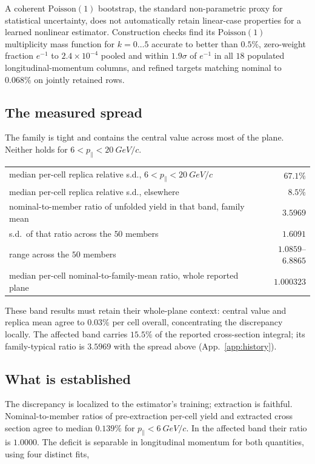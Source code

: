A coherent $\mathrm{Poisson}(1)$ bootstrap, the standard non-parametric proxy for statistical uncertainty, does not automatically retain linear-case properties for a learned nonlinear estimator. Construction checks find its $\mathrm{Poisson}(1)$ multiplicity mass function for $k=0\ldots5$ accurate to better than $0.5\%$, zero-weight fraction $e^{-1}$ to $2.4\times10^{-4}$ pooled and within $1.9\sigma$ of $e^{-1}$ in all $18$ populated longitudinal-momentum columns, and refined targets matching nominal to $0.068\%$ on jointly retained rows.

\subsection{The measured spread}

The family is tight and contains the central value across most of the plane. Neither holds for $6 < p_{\parallel} < \SI{20}{GeV/c}$.

\begin{center}
\begin{tabular}{lr}
\hline
median per-cell replica relative s.d., $6<p_{\parallel}<\SI{20}{GeV/c}$ & $67.1\%$ \\
median per-cell replica relative s.d., elsewhere & $8.5\%$ \\
nominal-to-member ratio of unfolded yield in that band, family mean & $3.5969$ \\
s.d.\ of that ratio across the $50$ members & $1.6091$ \\
range across the $50$ members & $1.0859$--$6.8865$ \\
median per-cell nominal-to-family-mean ratio, whole reported plane & $1.000323$ \\
\hline
\end{tabular}
\end{center}

These band results must retain their whole-plane context: central value and replica mean agree to $0.03\%$ per cell overall, concentrating the discrepancy locally. The affected band carries $15.5\%$ of the reported cross-section integral; its family-typical ratio is $3.5969$ with the spread above (App.~\ref{app:history}).

\subsection{What is established}

The discrepancy is localized to the estimator's training; extraction is faithful. Nominal-to-member ratios of pre-extraction per-cell yield and extracted cross section agree to median $0.139\%$ for $p_{\parallel} < \SI{6}{GeV/c}$. In the affected band their ratio is $1.0000$. The deficit is separable in longitudinal momentum for both quantities, using four distinct fits,

